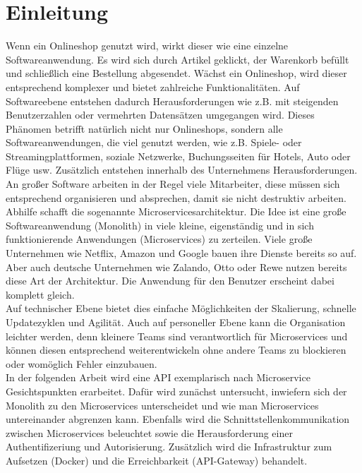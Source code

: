 \section{Einleitung}\label{sec:einleitung}

Wenn ein Onlineshop genutzt wird, wirkt dieser wie eine einzelne Softwareanwendung. Es wird sich durch Artikel geklickt, der Warenkorb befüllt und schließlich eine Bestellung abgesendet. Wächst ein Onlineshop, wird dieser entsprechend komplexer und bietet zahlreiche Funktionalitäten. Auf Softwareebene entstehen dadurch Herausforderungen wie z.B. mit steigenden Benutzerzahlen oder vermehrten Datensätzen umgegangen wird. Dieses Phänomen betrifft natürlich nicht nur Onlineshops, sondern alle Softwareanwendungen, die viel genutzt werden, wie z.B. Spiele- oder Streamingplattformen, soziale Netzwerke, Buchungsseiten für Hotels, Auto oder Flüge usw. Zusätzlich entstehen innerhalb des Unternehmens Herausforderungen. An großer Software arbeiten in der Regel viele Mitarbeiter, diese müssen sich entsprechend organisieren und absprechen, damit sie nicht destruktiv arbeiten.\\

Abhilfe schafft die sogenannte Microservicesarchitektur. Die Idee ist eine große Softwareanwendung (Monolith) in viele kleine, eigenständig und in sich funktionierende Anwendungen (Microservices) zu zerteilen. Viele große Unternehmen wie Netflix, Amazon und Google bauen ihre Dienste bereits so auf. Aber auch deutsche Unternehmen wie Zalando, Otto oder Rewe nutzen bereits diese Art der Architektur. Die Anwendung für den Benutzer erscheint dabei komplett gleich.\\

Auf technischer Ebene bietet dies einfache Möglichkeiten der Skalierung, schnelle Updatezyklen und Agilität. Auch auf personeller Ebene kann die Organisation leichter werden, denn kleinere Teams sind verantwortlich für Microservices und können diesen entsprechend weiterentwickeln ohne andere Teams zu blockieren oder womöglich Fehler einzubauen. \\

In der folgenden Arbeit wird eine API exemplarisch nach Microservice Gesichtspunkten erarbeitet. Dafür wird zunächst untersucht, inwiefern sich der Monolith zu den Microservices unterscheidet und wie man Microservices untereinander abgrenzen kann. Ebenfalls wird die Schnittstellenkommunikation zwischen Microservices beleuchtet sowie die Herausforderung einer Authentifizeriung und Autorisierung. Zusätzlich wird die Infrastruktur zum Aufsetzen (Docker) und die Erreichbarkeit (API-Gateway) behandelt.\\ 

